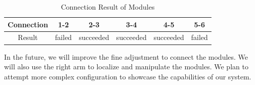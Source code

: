 \begin{table}[h]
\caption{Connection Result of Modules} %
\begin{tabular}{|c |c |c |c |c |c|}
\hline
 Connection &  1-2 & 2-3 & 3-4 & 4-5 & 5-6 \\\hline 
  Result  & failed & succeeded & succeeded & succeeded & failed \\\hline  
\end{tabular}\label{table:result}
\end{table}

In the future, we will improve the fine adjustment to connect the modules. We will also use the right arm to localize and manipulate the modules. We plan to attempt more complex configuration to showcase the capabilities of our system.


